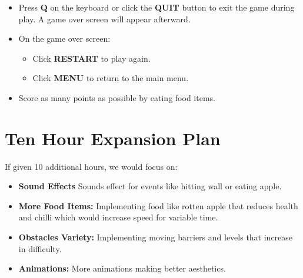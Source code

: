\begin{itemize}
\item Press \textbf{Q} on the keyboard or click the \textbf{QUIT} button to exit the game during play. A game over screen will appear afterward.
\item On the game over screen:
\begin{itemize}
    \item Click \textbf{RESTART} to play again.
    \item Click \textbf{MENU} to return to the main menu.
\end{itemize}
\item Score as many points as possible by eating food items.
\end{itemize}

 
\section{Ten Hour Expansion Plan}
If given 10 additional hours, we would focus on:
\begin{itemize}
    \item \textbf{Sound Effects} Sounds effect for events like hitting wall or eating apple.
    \item \textbf{More Food Items:} Implementing food like rotten apple that reduces health and chilli which would increase speed for variable time.
    \item \textbf{  Obstacles Variety:} Implementing moving barriers and levels that increase in difficulty.
    \item \textbf{Animations:} More animations making better aesthetics.
\end{itemize}
\nocite{*}
\printbibliography

